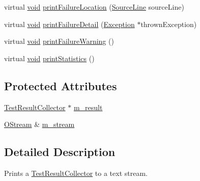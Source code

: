 \begin{DoxyCompactItemize}
\item 
virtual \hyperlink{wglew_8h_aeea6e3dfae3acf232096f57d2d57f084}{void} \hyperlink{class_text_outputter_a5ba7ad1968b180ce9593373718632af9}{print\-Failure\-Location} (\hyperlink{class_source_line}{Source\-Line} source\-Line)
\item 
virtual \hyperlink{wglew_8h_aeea6e3dfae3acf232096f57d2d57f084}{void} \hyperlink{class_text_outputter_ae1a2ad2deebf4b12f803c59d867980f7}{print\-Failure\-Detail} (\hyperlink{class_exception}{Exception} $\ast$thrown\-Exception)
\item 
virtual \hyperlink{wglew_8h_aeea6e3dfae3acf232096f57d2d57f084}{void} \hyperlink{class_text_outputter_a254f58361b8f5c59b60df1c007d9a438}{print\-Failure\-Warning} ()
\item 
virtual \hyperlink{wglew_8h_aeea6e3dfae3acf232096f57d2d57f084}{void} \hyperlink{class_text_outputter_aeabfe5420c137b0a935c5b0acb45a6d8}{print\-Statistics} ()
\end{DoxyCompactItemize}
\subsection*{Protected Attributes}
\begin{DoxyCompactItemize}
\item 
\hyperlink{class_test_result_collector}{Test\-Result\-Collector} $\ast$ \hyperlink{class_text_outputter_a465e8c580e6f2db9ed021e1c44b95eb2}{m\-\_\-result}
\item 
\hyperlink{_stream_8h_a80291a4e32881b445c8d4f839a9dd979}{O\-Stream} \& \hyperlink{class_text_outputter_a947e16694e57297974e0f651d6298b80}{m\-\_\-stream}
\end{DoxyCompactItemize}


\subsection{Detailed Description}
Prints a \hyperlink{class_test_result_collector}{Test\-Result\-Collector} to a text stream. 

